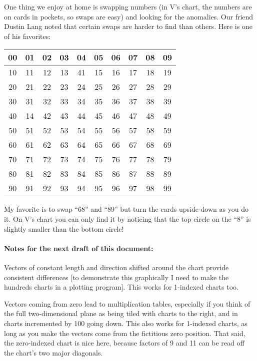 \documentclass[12pt]{article}
\newcommand{\tablesize}{\footnotesize\sffamily}
\begin{document}
One thing we enjoy at home is swapping numbers (in V's chart, the
numbers are on cards in pockets, so swaps are easy) and looking for
the anomalies.  Our friend Dustin Lang noted that certain swaps are
harder to find than others.  Here is one of his favorites:
\begin{center}\tablesize
\begin{tabular}{|c|c|c|c|c|c|c|c|c|c|}
\hline
 00 & 01 & 02 & 03 & 04 & 05 & 06 & 07 & 08 & 09 \\ \hline
 10 & 11 & 12 & 13 & 41 & 15 & 16 & 17 & 18 & 19 \\ \hline
 20 & 21 & 22 & 23 & 24 & 25 & 26 & 27 & 28 & 29 \\ \hline
 30 & 31 & 32 & 33 & 34 & 35 & 36 & 37 & 38 & 39 \\ \hline
 40 & 14 & 42 & 43 & 44 & 45 & 46 & 47 & 48 & 49 \\ \hline
 50 & 51 & 52 & 53 & 54 & 55 & 56 & 57 & 58 & 59 \\ \hline
 60 & 61 & 62 & 63 & 64 & 65 & 66 & 67 & 68 & 69 \\ \hline
 70 & 71 & 72 & 73 & 74 & 75 & 76 & 77 & 78 & 79 \\ \hline
 80 & 81 & 82 & 83 & 84 & 85 & 86 & 87 & 88 & 89 \\ \hline
 90 & 91 & 92 & 93 & 94 & 95 & 96 & 97 & 98 & 99 \\ \hline
\end{tabular}
\end{center}
My favorite is to swap ``68'' and ``89'' but turn the cards
upside-down as you do it.  On V's chart you can only find it by
noticing that the top circle on the ``8'' is slightly smaller than the
bottom circle!

\paragraph{Notes for the next draft of this document:}
Vectors of constant length and direction shifted around the chart
provide consistent differences [to demonstrate this graphically I need
  to make the hundreds charts in a plotting program].  This works for
1-indexed charts too.

Vectors coming from zero lead to multiplication tables, especially if
you think of the full two-dimensional plane as being tiled with charts
to the right, and in charts incremented by 100 going down.  This also
works for 1-indexed charts, as long as you make the vectors come from
the fictitious zero position.  That said, the zero-indexed chart is
nice here, because factors of 9 and 11 can be read off the chart's two
major diagonals.
\end{document}
